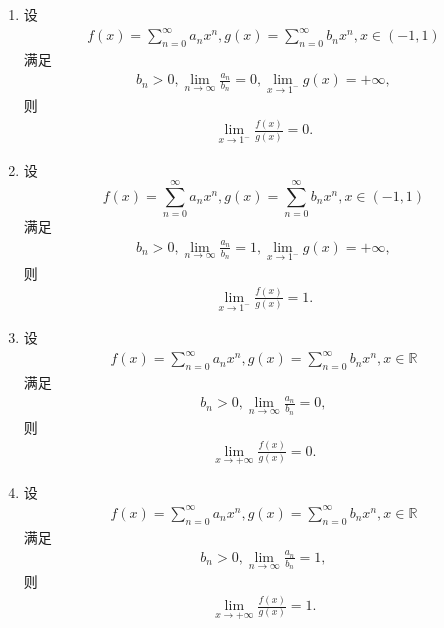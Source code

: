 \documentclass[../../main.tex]{subfiles}%
\begin{document}
\begin{theorem}[幂级数系数的阶蕴含幂级数和函数的阶]\label{theorem:幂级数系数的阶蕴含幂级数和函数的阶}
\begin{enumerate}[(1)]
\item 设
\begin{align}
f(x) = \sum_{n=0}^{\infty} a_n x^n, g(x) = \sum_{n=0}^{\infty} b_n x^n, x \in (-1,1)
\end{align}
满足
\begin{align}
b_n > 0, \lim_{n \to \infty} \frac{a_n}{b_n} = 0, \lim_{x \to 1^-} g(x) = +\infty, \label{eq::::--::--12301749-EQ:13---92788648184FDAG..1}
\end{align}
则
\begin{align}
\lim_{x \to 1^-} \frac{f(x)}{g(x)} = 0. \label{eq::::--::--12301349-EQ:13---92788648184FDAG..1}
\end{align}

\item 设
\[
f(x) = \sum_{n=0}^{\infty} a_n x^n, g(x) = \sum_{n=0}^{\infty} b_n x^n, x \in (-1,1)
\]
满足
\begin{align}
b_n > 0, \lim_{n \to \infty} \frac{a_n}{b_n} = 1, \lim_{x \to 1^-} g(x) = +\infty, \label{eq::::--::--123349-EQ:13---92788648184FDAG..1}
\end{align}
则
\begin{align}
\lim_{x \to 1^-} \frac{f(x)}{g(x)} = 1. \label{eq::::--::--1233241449-EQ:13---92788648184FDAG..1}
\end{align}

\item 设
\begin{align}
f(x) = \sum_{n=0}^{\infty} a_n x^n, g(x) = \sum_{n=0}^{\infty} b_n x^n, x \in \mathbb{R}
\end{align}
满足
\begin{align}
b_n > 0, \lim_{n \to \infty} \frac{a_n}{b_n} = 0, \label{eq::::--::-2341233241449-EQ:13---92788648184FDAG..1}
\end{align}
则
\begin{align}
\lim_{x \to +\infty} \frac{f(x)}{g(x)} = 0. \label{eq::::--::-233241449-EQ:13---92788648184FDAG..1}
\end{align}

\item 设
\begin{align}
f(x) = \sum_{n=0}^{\infty} a_n x^n, g(x) = \sum_{n=0}^{\infty} b_n x^n, x \in \mathbb{R}
\end{align}
满足
\begin{align}
b_n > 0, \lim_{n \to \infty} \frac{a_n}{b_n} = 1, \label{eq::::--::-23412332449-EQ:13---92788648184FDAG..1}
\end{align}
则
\begin{align}
\lim_{x \to +\infty} \frac{f(x)}{g(x)} = 1. \label{eq::::--::-2332419-EQ:13---92788648184FDAG..1}
\end{align}
\end{enumerate}
\end{theorem}
\end{document}
